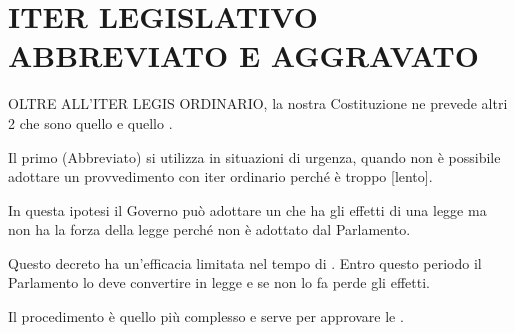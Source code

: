 \documentclass[letterpaper,10pt,italian]{sphinxmanual}
\begin{document}
\sphinxstepscope


\chapter{ITER LEGISLATIVO ABBREVIATO E AGGRAVATO}
\label{\detokenize{ITER LEGISLATIVO ABBREVIATO E AGGRAVATO:iter-legislativo-abbreviato-e-aggravato}}\label{\detokenize{ITER LEGISLATIVO ABBREVIATO E AGGRAVATO::doc}}
\sphinxAtStartPar
OLTRE ALL’ITER LEGIS ORDINARIO, la nostra Costituzione ne prevede altri 2 che sono quello 
e quello .

\sphinxAtStartPar
Il primo (Abbreviato) si utilizza in situazioni di urgenza, quando non è possibile adottare un provvedimento con
iter ordinario perché è troppo {[}lento{]}.

\sphinxAtStartPar
In questa ipotesi il Governo può adottare un  che ha gli effetti di una legge ma non
ha la forza della legge perché non è adottato dal Parlamento.

\sphinxAtStartPar
Questo decreto ha un’efficacia limitata nel tempo di .
Entro questo periodo il Parlamento lo deve convertire in legge e se non lo fa perde gli effetti.

\sphinxAtStartPar
Il procedimento  è quello più complesso e serve per approvare le .
\end{document}
